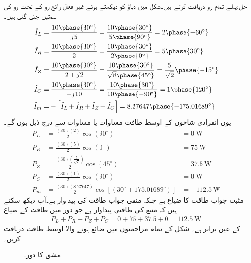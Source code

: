 حل:پہلے تمام رو دریافت کرتے ہیں۔شکل میں دباؤ کو دیکھتے ہوئے غیر فعال رائج رو کے تحت رو کی سمتیں چنی گئی ہیں۔ 
\begin{align*}
\hat{I}_L&=\frac{10\phase{30^{\circ}}}{j5}=\frac{10\phase{30^{\circ}}}{5\phase{90^{\circ}}}=2\phase{-60^{\circ}}\\
\hat{I}_R&=\frac{10\phase{30^{\circ}}}{2}=\frac{10\phase{30^{\circ}}}{2\phase{0^{\circ}}}=5\phase{30^{\circ}}\\
\hat{I}_Z&=\frac{10\phase{30^{\circ}}}{2+j2}=\frac{10\phase{30^{\circ}}}{\sqrt{8}\phase{45^{\circ}}}=\frac{5}{\sqrt{2}}\phase{-15^{\circ}}\\
\hat{I}_C&=\frac{10\phase{30^{\circ}}}{-j10}=\frac{10\phase{30^{\circ}}}{10\phase{-90^{\circ}}}=1\phase{120^{\circ}}\\
\hat{I}_m&=-\left[\hat{I}_L+\hat{I}_R+\hat{I}_Z+\hat{I}_C\right]=8.27647\phase{-175.01689^{\circ}}
\end{align*}
یوں انفرادی شاخوں کے اوسط طاقت مساوات  یا مساوات  سے درج ذیل ہوں گے۔
\begin{align*}
P_L&=\frac{(30)(2)}{2}\cos(90^{\circ})&=\SI{0}{\watt}\\
P_R&=\frac{(30)(5)}{2}\cos(0^{\circ})&=\SI{75}{\watt}\\
P_Z&=\frac{(30)(\tfrac{5}{\sqrt{2}})}{2}\cos(45^{\circ})&=\SI{37.5}{\watt}\\
P_C&=\frac{(30)(1)}{2}\cos(90^{\circ})&=\SI{0}{\watt}\\
P_m&=\frac{(30)(8.27647)}{2}\cos[(30^{\circ}+175.01689^{\circ})]&=-\SI{112.5}{\watt}
\end{align*}
مثبت جواب طاقت کا ضیاع ہے جبکہ منفی جواب طاقت کی پیداوار ہے۔آپ دیکھ سکتے ہیں کہ منبع کی طاقتی پیداوار  ہے جو دور میں طاقت کے ضیاع 
\begin{align*}
P_L+P_R+P_Z+P_C=0+75+37.5+0=\SI{112.5}{\watt}
\end{align*}
کے عین برابر ہے۔
شکل  کے تمام مزاحمتوں میں ضائع ہونے والا اوسط طاقت دریافت کریں۔


\begin{figure}
\centering
{}
\caption{مشق  کا دور۔}
\label{شکل_طاقت_دریافت_کریں_الف}
\end{figure}

